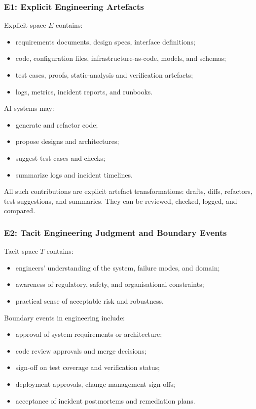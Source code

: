 \subsubsection*{E1: Explicit Engineering Artefacts}

Explicit space $E$ contains:

\begin{itemize}
  \item requirements documents, design specs, interface definitions;
  \item code, configuration files, infrastructure-as-code, models, and schemas;
  \item test cases, proofs, static-analysis and verification artefacts;
  \item logs, metrics, incident reports, and runbooks.
\end{itemize}

AI systems may:

\begin{itemize}
  \item generate and refactor code;
  \item propose designs and architectures;
  \item suggest test cases and checks;
  \item summarize logs and incident timelines.
\end{itemize}

All such contributions are explicit artefact transformations: drafts, diffs, refactors, test suggestions,
and summaries. They can be reviewed, checked, logged, and compared.

\subsubsection*{E2: Tacit Engineering Judgment and Boundary Events}

Tacit space $T$ contains:

\begin{itemize}
  \item engineers' understanding of the system, failure modes, and domain;
  \item awareness of regulatory, safety, and organisational constraints;
  \item practical sense of acceptable risk and robustness.
\end{itemize}

Boundary events in engineering include:

\begin{itemize}
  \item approval of system requirements or architecture;
  \item code review approvals and merge decisions;
  \item sign-off on test coverage and verification status;
  \item deployment approvals, change management sign-offs;
  \item acceptance of incident postmortems and remediation plans.
\end{itemize}

